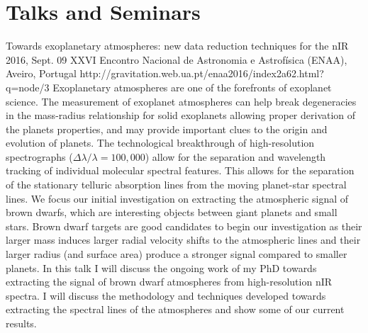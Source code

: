 \section{Talks and Seminars}\label{app_sec:talks}

{Towards exoplanetary atmospheres: new data reduction techniques for the nIR} %
{2016, Sept. 09}%
{XXVI Encontro Nacional de Astronomia e Astrofísica (ENAA), Aveiro, Portugal}%
{http://gravitation.web.ua.pt/enaa2016/index2a62.html?q=node/3}%
{}%
{Exoplanetary atmospheres are one of the forefronts of exoplanet science. The measurement of exoplanet atmospheres can help break degeneracies in the mass-radius relationship for solid exoplanets allowing proper derivation of the planets properties, and may provide important clues to the origin and evolution of planets. The technological breakthrough of high-resolution spectrographs ($\Delta \lambda / \lambda = 100,000$) allow for the separation and wavelength tracking of individual molecular spectral features. This allows for the separation of the stationary telluric absorption lines from the moving planet-star spectral lines. We focus our initial investigation on extracting the atmospheric signal of brown dwarfs, which are interesting objects between giant planets and small stars. Brown dwarf targets are good candidates to begin our investigation as their larger mass induces larger radial velocity shifts to the atmospheric lines and their larger radius (and surface area) produce a stronger signal compared to smaller planets. In this talk I will discuss the ongoing work of my PhD towards extracting the signal of brown dwarf atmospheres from high-resolution nIR spectra. I will discuss the methodology and techniques developed towards extracting the spectral lines of the atmospheres and show some of our current results.}%


